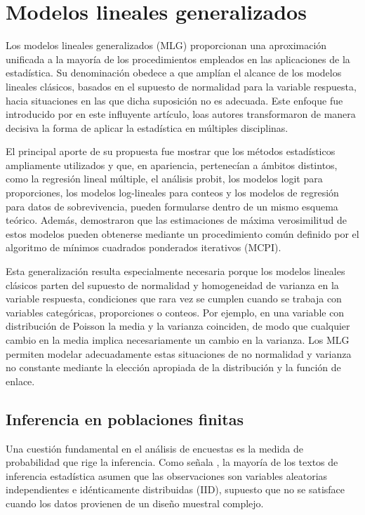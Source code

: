 \documentclass[
  spanish,
  12pt,
]{book}
\begin{document}
\chapter{Modelos lineales generalizados}\label{cap-glm}

Los modelos lineales generalizados (MLG) proporcionan una aproximación unificada a la mayoría de los procedimientos empleados en las aplicaciones de la estadística. Su denominación obedece a que amplían el alcance de los modelos lineales clásicos, basados en el supuesto de normalidad para la variable respuesta, hacia situaciones en las que dicha suposición no es adecuada. Este enfoque fue introducido por \citet{nelder1972generalized} en este influyente artículo, loas autores transformaron de manera decisiva la forma de aplicar la estadística en múltiples disciplinas.

El principal aporte de su propuesta fue mostrar que los métodos estadísticos ampliamente utilizados y que, en apariencia, pertenecían a ámbitos distintos, como la regresión lineal múltiple, el análisis probit, los modelos logit para proporciones, los modelos log-lineales para conteos y los modelos de regresión para datos de sobrevivencia, pueden formularse dentro de un mismo esquema teórico. Además, demostraron que las estimaciones de máxima verosimilitud de estos modelos pueden obtenerse mediante un procedimiento común definido por el algoritmo de mínimos cuadrados ponderados iterativos (MCPI).

Esta generalización resulta especialmente necesaria porque los modelos lineales clásicos parten del supuesto de normalidad y homogeneidad de varianza en la variable respuesta, condiciones que rara vez se cumplen cuando se trabaja con variables categóricas, proporciones o conteos. Por ejemplo, en una variable con distribución de Poisson la media y la varianza coinciden, de modo que cualquier cambio en la media implica necesariamente un cambio en la varianza. Los MLG permiten modelar adecuadamente estas situaciones de no normalidad y varianza no constante mediante la elección apropiada de la distribución y la función de enlace.

\section{Inferencia en poblaciones finitas}\label{sec-mpv}

Una cuestión fundamental en el análisis de encuestas es la medida de probabilidad que rige la inferencia. Como señala \citet{kish1987statistical}, la mayoría de los textos de inferencia estadística asumen que las observaciones son variables aleatorias independientes e idénticamente distribuidas (IID), supuesto que no se satisface cuando los datos provienen de un diseño muestral complejo.
\end{document}
